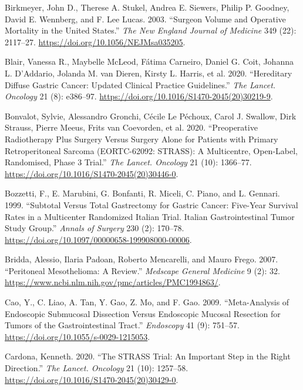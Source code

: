\documentclass[
  letterpaper,
]{scrbook}
\newlength{\cslhangindent}
\newenvironment{CSLReferences}[2] %
 {\begin{list}{}{%
  \setlength{\itemindent}{0pt}
  \setlength{\leftmargin}{0pt}
  \setlength{\parsep}{0pt}
  \ifodd #1
   \setlength{\leftmargin}{\cslhangindent}
   \setlength{\itemindent}{-1\cslhangindent}
  \fi
  \setlength{\itemsep}{#2\baselineskip}}}
 {\end{list}}
\begin{document}
\begin{CSLReferences}{1}{0}
Birkmeyer, John D., Therese A. Stukel, Andrea E. Siewers, Philip P.
Goodney, David E. Wennberg, and F. Lee Lucas. 2003. {``Surgeon Volume
and Operative Mortality in the {United} {States}.''} \emph{The New
England Journal of Medicine} 349 (22): 2117--27.
\url{https://doi.org/10.1056/NEJMsa035205}.

Blair, Vanessa R., Maybelle McLeod, Fátima Carneiro, Daniel G. Coit,
Johanna L. D'Addario, Jolanda M. van Dieren, Kirsty L. Harris, et al.
2020. {``Hereditary Diffuse Gastric Cancer: Updated Clinical Practice
Guidelines.''} \emph{The Lancet. Oncology} 21 (8): e386--97.
\url{https://doi.org/10.1016/S1470-2045(20)30219-9}.

Bonvalot, Sylvie, Alessandro Gronchi, Cécile Le Péchoux, Carol J.
Swallow, Dirk Strauss, Pierre Meeus, Frits van Coevorden, et al. 2020.
{``Preoperative Radiotherapy Plus Surgery Versus Surgery Alone for
Patients with Primary Retroperitoneal Sarcoma ({EORTC}-62092: {STRASS}):
A Multicentre, Open-Label, Randomised, Phase 3 Trial.''} \emph{The
Lancet. Oncology} 21 (10): 1366--77.
\url{https://doi.org/10.1016/S1470-2045(20)30446-0}.

Bozzetti, F., E. Marubini, G. Bonfanti, R. Miceli, C. Piano, and L.
Gennari. 1999. {``Subtotal Versus Total Gastrectomy for Gastric Cancer:
Five-Year Survival Rates in a Multicenter Randomized {Italian} Trial.
{Italian} {Gastrointestinal} {Tumor} {Study} {Group}.''} \emph{Annals of
Surgery} 230 (2): 170--78.
\url{https://doi.org/10.1097/00000658-199908000-00006}.

Bridda, Alessio, Ilaria Padoan, Roberto Mencarelli, and Mauro Frego.
2007. {``Peritoneal {Mesothelioma}: {A} {Review}.''} \emph{Medscape
General Medicine} 9 (2): 32.
\url{https://www.ncbi.nlm.nih.gov/pmc/articles/PMC1994863/}.

Cao, Y., C. Liao, A. Tan, Y. Gao, Z. Mo, and F. Gao. 2009.
{``Meta-Analysis of Endoscopic Submucosal Dissection Versus Endoscopic
Mucosal Resection for Tumors of the Gastrointestinal Tract.''}
\emph{Endoscopy} 41 (9): 751--57.
\url{https://doi.org/10.1055/s-0029-1215053}.

Cardona, Kenneth. 2020. {``The {STRASS} Trial: An Important Step in the
Right Direction.''} \emph{The Lancet. Oncology} 21 (10): 1257--58.
\url{https://doi.org/10.1016/S1470-2045(20)30429-0}.


\end{CSLReferences}
\end{document}
